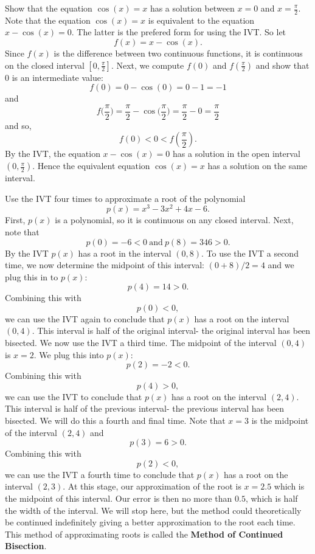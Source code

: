 \documentclass{ximera}
\begin{document}
\begin{example} %
 Show that the equation $\cos(x) = x$ has a solution 
between $x = 0$ and $x = \frac{\pi}{2}$. \\
Note that the equation $\cos(x) = x$ is equivalent to the equation $x - \cos(x) =0$.
The latter is the prefered form for using the IVT.
So let 
\[f(x) = x - \cos(x).\] 
 Since $f(x)$ is the difference between two continuous functions,
it is continuous on the closed interval $[0, \frac{\pi}{2}]$. 
Next, we compute $f(0)$ and $f(\frac{\pi}{2})$ and show that 0 is an intermediate value:
\[f(0) = 0 - \cos(0) = 0-1 = -1 \]
and
\[f\big(\frac{\pi}{2}\big) = \frac{\pi}{2} - \cos\big(\frac{\pi}{2}\big) = \frac{\pi}{2}-0 = \frac{\pi}{2} \]
and so,
\[f(0) < 0 < f(\frac{\pi}{2}).\]
By the IVT, the equation $ x - \cos(x) =0$ has a solution in the open 
interval $(0, \frac{\pi}{2})$. Hence the equivalent equation $\cos(x) = x$ 
has a solution on the same interval.
\end{example}

\begin{example} %
Use the IVT four times to approximate a root of the polynomial 
\[p(x) = x^3 - 3x^2 + 4x - 6.\]
First, $p(x)$ is a polynomial, so it is continuous on any closed interval.
Next, note that 
\[p(0) = -6 < 0 \ \text{and} \ p(8) = 346 > 0.\]
By the IVT $p(x)$ has a root in the interval $(0, 8)$. 
To use the IVT a second time, we now determine the midpoint of this interval: $(0+8)/2 = 4$ and we 
plug this in to $p(x)$:
\[p(4) =  14 > 0.\]
Combining this with
\[p(0) < 0,\]
we can use the IVT again to conclude that $p(x)$ has a root on the interval $(0, 4)$. 
This interval is half of the original interval- the original interval has been bisected. 
We now use the IVT a third time. The midpoint of the interval $(0, 4)$ is $x=2$. We plug this into $p(x)$:
\[p(2) =  -2 < 0.\]
Combining this with
\[p(4) > 0,\]
we can use the IVT to conclude that $p(x)$ has a root on the interval $(2,4)$. 
This interval is half of the previous interval- the previous interval has been bisected. 
We will do this a fourth and final time. Note that $x = 3$ is the midpoint of the interval $(2,4)$ and
\[p(3) = 6 > 0.\]
Combining this with
\[p(2) < 0,\]
we can use the IVT a fourth time to conclude that $p(x)$ has a root on the interval $(2, 3)$. 
At this stage, our approximation of the root is $x = 2.5$ which is the midpoint of this interval. 
Our error is then no more than $0.5$, which is half the width of the interval.
We will stop here, but the method could theoretically be continued indefinitely giving a better 
approximation to the root each time. This method of approximating roots is called the 
\textbf{Method of Continued Bisection}.
\end{example}


\begin{center}
\begin{foldable}
\end{foldable}
\end{center}
\end{document}
